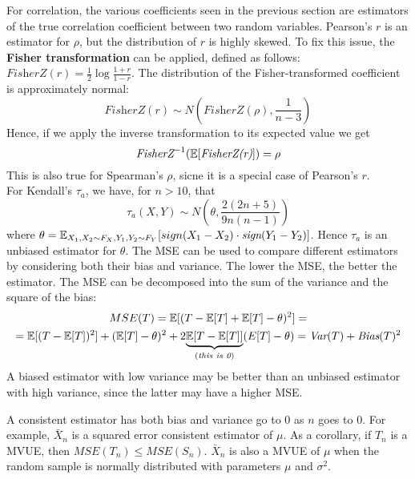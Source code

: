 For correlation, the various coefficients seen in the previous section are estimators of the true correlation coefficient between two random variables. Pearson's $r$ is an estimator for $\rho$, but the distribution of $r$ is highly skewed. To fix this issue, the \textbf{Fisher transformation} can be applied, defined as follows: $\textit{FisherZ}(r) = \frac{1}{2} \log\frac{1+r}{1-r}$. The distribution of the Fisher-transformed coefficient is approximately normal:
\[
    \textit{FisherZ}(r) \sim N\left(\textit{FisherZ}(\rho), \frac{1}{n-3}\right)
\]
Hence, if we apply the inverse transformation to its expected value we get
\[
    \textit{FisherZ}^{-1} (\mathbb{E}[\textit{FisherZ(r)}]) = \rho
\]
This is also true for Spearman's $\rho$, sicne it is a special case of Pearson's $r$. \\
For Kendall's $\tau_a$, we have, for $n > 10$, that
\[
    \tau_a (X,Y) \sim N\left(\theta, \frac{2(2n + 5)}{9n(n-1)}\right)
\]
where $\theta = \mathbb{E}_{X_1,X_2 \sim F_X, Y_1, Y_2 \sim F_Y}[sign(X_1 - X_2) \cdot \textit{sign}(Y_1 - Y_2)]$. Hence $\tau_a$ is an unbiased estimator for $\theta$.
The MSE can be used to compare different estimators by considering both their bias and variance. The lower the MSE, the better the estimator. The MSE can be decomposed into the sum of the variance and the square of the bias:
\begin{gather*}
    MSE(T) = \mathbb{E}[(T - \mathbb{E}[T] + \mathbb{E}[T] - \theta)^2] =\\
    = \mathbb{E}[(T - \mathbb{E}[T])^2] + (\mathbb{E}[T] - \theta)^2 + 2\underset{(\textit{this is 0})}{\underbrace{{\mathbb{E}[T - \mathbb{E}[T]]}}}(E[T]- \theta) = \textit{Var}(T) + \textit{Bias}(T)^2
\end{gather*}
A biased estimator with low variance may be better than an unbiased estimator with high variance, since the latter may have a higher MSE.

A consistent estimator has both bias and variance go to 0 as $n$ goes to 0. For example, $\bar{X}_n$ is a squared error consistent estimator of $\mu$.
As a corollary, if $T_n$ is a MVUE, then $MSE(T_n) \leq MSE(S_n)$. $\bar{X}_n$ is also a MVUE of $\mu$ when the random sample is normally distributed with parameters $\mu$ and $\sigma^2$.